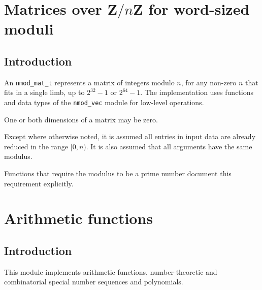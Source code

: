 \documentclass[a4paper,10pt]{book}
\newcommand{\Z}{\mathbf{Z}}%
\newcommand{\code}{\lstinline}
\begin{document}
\chapter{Matrices over $\Z / n \Z$ for word-sized moduli}

\section{Introduction}

An \code{nmod_mat_t} represents a matrix of integers modulo $n$, for any 
non-zero $n$ that fits in a single limb, up to $2^{32}-1$ or $2^{64}-1$. The
implementation uses functions and data types of the \code{nmod_vec} module
for low-level operations.

One or both dimensions of a matrix may be zero.

Except where otherwise noted, it is assumed all entries in input
data are already reduced in the range $[0, n)$. It is also assumed that
all arguments have the same modulus.

Functions that require the modulus to be a prime number document this
requirement explicitly.




\chapter{Arithmetic functions}

\section{Introduction}

This module implements arithmetic functions, number-theoretic and 
combinatorial special number sequences and polynomials.




\backmatter

{}


\end{document}

